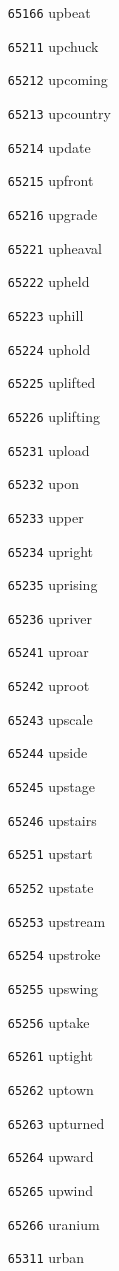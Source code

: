 \documentclass[twoside,11pt]{article}
\begin{document}
\begin{multicols}{5}
\begin{enumerate}
\item[\texttt{65166}] upbeat
\item[\texttt{65211}] upchuck
\item[\texttt{65212}] upcoming
\item[\texttt{65213}] upcountry
\item[\texttt{65214}] update
\item[\texttt{65215}] upfront
\item[\texttt{65216}] upgrade
\item[\texttt{65221}] upheaval
\item[\texttt{65222}] upheld
\item[\texttt{65223}] uphill
\item[\texttt{65224}] uphold
\item[\texttt{65225}] uplifted
\item[\texttt{65226}] uplifting
\item[\texttt{65231}] upload
\item[\texttt{65232}] upon
\item[\texttt{65233}] upper
\item[\texttt{65234}] upright
\item[\texttt{65235}] uprising
\item[\texttt{65236}] upriver
\item[\texttt{65241}] uproar
\item[\texttt{65242}] uproot
\item[\texttt{65243}] upscale
\item[\texttt{65244}] upside
\item[\texttt{65245}] upstage
\item[\texttt{65246}] upstairs
\item[\texttt{65251}] upstart
\item[\texttt{65252}] upstate
\item[\texttt{65253}] upstream
\item[\texttt{65254}] upstroke
\item[\texttt{65255}] upswing
\item[\texttt{65256}] uptake
\item[\texttt{65261}] uptight
\item[\texttt{65262}] uptown
\item[\texttt{65263}] upturned
\item[\texttt{65264}] upward
\item[\texttt{65265}] upwind
\item[\texttt{65266}] uranium
\item[\texttt{65311}] urban

\end{enumerate}
\end{multicols}
\end{document}
